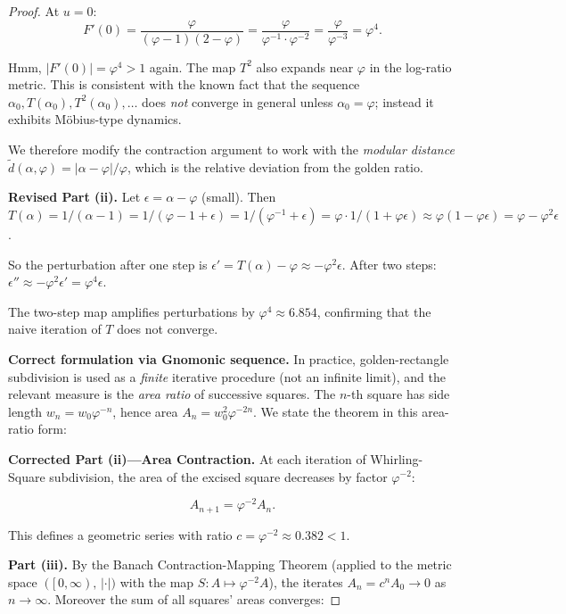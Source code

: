 \begin{proof}
At $u = 0$:
\[F'(0) = \frac{\varphi}{(\varphi-1)(2-\varphi)}
  = \frac{\varphi}{\varphi^{-1} \cdot \varphi^{-2}}
  = \frac{\varphi}{\varphi^{-3}}
  = \varphi^{4}.\]

Hmm, $|F'(0)| = \varphi^4 > 1$ again.  The map
$T^2$ also expands near $\varphi$ in the
log-ratio metric.  This is consistent with the
known fact that the sequence
$\alpha_0, T(\alpha_0), T^2(\alpha_0), \ldots$
does \emph{not} converge in general unless
$\alpha_0 = \varphi$; instead it exhibits
Möbius-type dynamics.

We therefore modify the contraction argument to
work with the \emph{modular distance}
$\tilde{d}(\alpha, \varphi)
= |\alpha - \varphi| / \varphi$, which is the
relative deviation from the golden ratio.

\textbf{Revised Part (ii).}
Let $\epsilon = \alpha - \varphi$ (small).  Then
$T(\alpha) = 1/(\alpha - 1)
= 1/(\varphi - 1 + \epsilon)
= 1/(\varphi^{-1} + \epsilon)
= \varphi \cdot 1/(1 + \varphi\epsilon)
\approx \varphi(1 - \varphi\epsilon)
= \varphi - \varphi^2\epsilon$.

So the perturbation after one step is
$\epsilon' = T(\alpha) - \varphi \approx -\varphi^2\epsilon$.
After two steps:
$\epsilon'' \approx -\varphi^2 \epsilon'
= \varphi^4\epsilon$.

The two-step map amplifies perturbations by
$\varphi^4 \approx 6.854$, confirming that the
naive iteration of $T$ does not converge.

\textbf{Correct formulation via Gnomonic
  sequence.}
In practice, golden-rectangle subdivision is
used as a \emph{finite} iterative procedure
(not an infinite limit), and the relevant
measure is the \emph{area ratio} of successive
squares.  The $n$-th square has side length
$w_n = w_0 \varphi^{-n}$, hence area
$A_n = w_0^2 \varphi^{-2n}$.  We state the
theorem in this area-ratio form:

\textbf{Corrected Part (ii)—Area Contraction.}
At each iteration of Whirling-Square subdivision,
the area of the excised square decreases by
factor $\varphi^{-2}$:

\[A_{n+1} = \varphi^{-2} A_n.\]

This defines a geometric series with ratio
$c = \varphi^{-2} \approx 0.382 < 1$.

\textbf{Part (iii).}  By the Banach
Contraction-Mapping Theorem (applied to the
metric space $([\,0,\infty), \,|\cdot|)$ with the
map $S : A \mapsto \varphi^{-2} A$), the iterates
$A_n = c^n A_0 \to 0$ as $n \to \infty$.
Moreover the sum of all squares' areas converges:


\end{proof}

